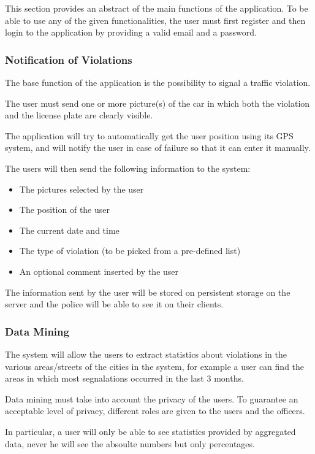 This section provides an abstract of the main functions of the application. To be able to use any of the given functionalities, the user must first register and then login to the application by providing a valid email and a password.
\subsubsection{Notification of Violations}
\label{sec:notification_of_violations}
The base function of the application is the possibility to signal a traffic violation.

The user must send one or more picture(s) of the car in which both the violation and the license plate are clearly visible.

The application will try to automatically get the user position using its GPS system, and will notify the user in case of failure so that it can enter it manually.

The users will then send the following information to the system:
\begin{itemize}
    \item The pictures selected by the user
    \item The position of the user
    \item The current date and time
    \item The type of violation (to be picked from a pre-defined list)
    \item An optional comment inserted by the user
\end{itemize}
The information sent by the user will be stored on persistent storage on the server and the police will be able to see it on their clients.

\subsubsection{Data Mining}
\label{sec:data_mining}
The system will allow the users to extract statistics about violations in the various areas/streets of the cities in the system,
for example a user can find the areas in which most segnalations occurred in the last 3 months.

Data mining must take into account the privacy of the users.
To guarantee an acceptable level of privacy, different roles are given to the users and the officers.

In particular, a user will only be able to see statistics provided by aggregated data, never he will see the absoulte numbers but only percentages. 

